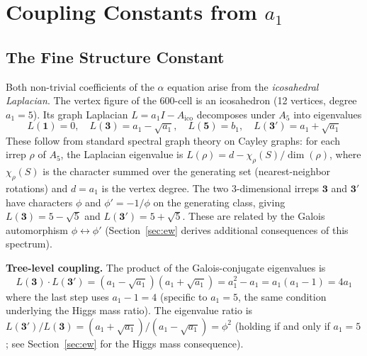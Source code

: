 \documentclass[12pt,a4paper]{article}
\theoremstyle{definition}
\begin{document}
\section{Coupling Constants from \texorpdfstring{$a_1$}{a1}}
\label{sec:coupling}

\subsection{The Fine Structure Constant}

Both non-trivial coefficients of the $\alpha$ equation arise from the \emph{icosahedral Laplacian}.  The vertex figure of the 600-cell is an icosahedron (12 vertices, degree~$a_1 = 5$).  Its graph Laplacian $L = a_1 I - A_{\text{ico}}$ decomposes under $A_5$ into eigenvalues
\begin{equation}
L(\mathbf{1}) = 0,\quad L(\mathbf{3}) = a_1 - \sqrt{a_1},\quad L(\mathbf{5}) = b_1,\quad L(\mathbf{3'}) = a_1 + \sqrt{a_1}
\label{eq:ico_laplacian}
\end{equation}
These follow from standard spectral graph theory on Cayley graphs: for each irrep $\rho$ of $A_5$, the Laplacian eigenvalue is $L(\rho) = d - \chi_\rho(S)/\dim(\rho)$, where $\chi_\rho(S)$ is the character summed over the generating set (nearest-neighbor rotations) and $d = a_1$ is the vertex degree.  The two 3-dimensional irreps $\mathbf{3}$ and $\mathbf{3'}$ have characters $\phi$ and $\phi' = -1/\phi$ on the generating class, giving $L(\mathbf{3}) = 5 - \sqrt{5}$ and $L(\mathbf{3'}) = 5 + \sqrt{5}$.  These are related by the Galois automorphism $\phi \leftrightarrow \phi'$ (Section~\ref{sec:ew} derives additional consequences of this spectrum).

\textbf{Tree-level coupling.}  The product of the Galois-conjugate eigenvalues is
\begin{equation}
L(\mathbf{3}) \cdot L(\mathbf{3'}) = (a_1 - \sqrt{a_1})(a_1+\sqrt{a_1}) = a_1^2 - a_1 = a_1(a_1-1) = 4a_1
\end{equation}
where the last step uses $a_1 - 1 = 4$ (specific to $a_1 = 5$, the same condition underlying the Higgs mass ratio).  The eigenvalue ratio is $L(\mathbf{3'})/L(\mathbf{3}) = (a_1 + \sqrt{a_1})/(a_1 - \sqrt{a_1}) = \phi^2$ (holding if and only if $a_1 = 5$; see Section~\ref{sec:ew} for the Higgs mass consequence).
\end{document}
